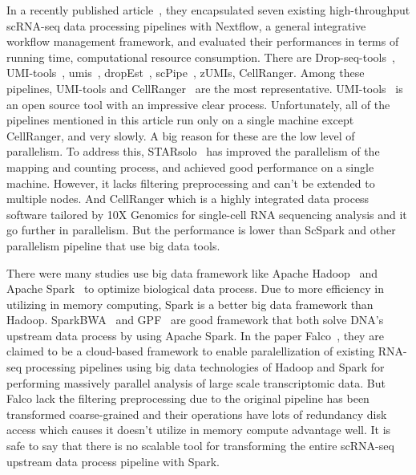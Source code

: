 \documentclass[runningheads]{llncs}
\begin{document}
In a recently published article~\cite{gao2020Comparison}, they encapsulated seven existing
                                                                                          high-throughput
                                                                                                          scRNA-seq data processing pipelines with Nextflow, a general integrative workflow management framework, and evaluated their performances in terms of running time, computational resource consumption.
There are Drop-seq-tools~\cite{macosko2015Dropseq}, UMI-tools~\cite{smith2017UMI}, umis~\cite{macaulay0Svensson}, dropEst~\cite{viktor2018dropEst}, scPipe~\cite{tian2018scPipe}, zUMIs\cite{swati0zUMIs}, CellRanger\cite{zheng2017Massively}.
Among these pipelines, UMI-tools\cite{smith2017UMI} and CellRanger~\cite{zheng2017Massively} are the most representative.
UMI-tools~\cite{ref_url1} is an open source tool with an impressive clear process.
Unfortunately, all of the pipelines mentioned in this article run only on a single machine except CellRanger, and very slowly.
A big reason for these are the low level of parallelism.
To address this, STARsolo~\cite{2019STARsolo} has improved the parallelism of the mapping and counting process, and achieved good performance on a single machine.
However, it lacks filtering preprocessing and can't be extended to multiple nodes.
And CellRanger which is a highly integrated data process software tailored by 10X Genomics for single-cell RNA sequencing analysis and it go further in parallelism.
But the performance is lower than ScSpark and other parallelism pipeline that use big data tools.

There were many studies use big data framework like Apache Hadoop~\cite{ref_url2} and Apache Spark~\cite{ref_url3} to optimize biological data process.
Due to more efficiency in utilizing in memory computing, Spark is a better big data framework than Hadoop.
SparkBWA~\cite{abuin2016sparkbwa} and GPF~\cite{li2018high} are good framework that both solve DNA's upstream data process by using Apache Spark.
In the paper Falco~\cite{Yang2016Falco}, they are claimed to be a cloud-based framework to enable paralellization of existing RNA-seq processing pipelines using big data technologies of Hadoop and Spark for performing massively parallel analysis of large scale transcriptomic data. 
But Falco lack the filtering preprocessing due to the original pipeline has been transformed coarse-grained and their operations have lots of redundancy disk access which causes it doesn't utilize in memory compute advantage well.
It is safe to say that there is no scalable tool for transforming the entire scRNA-seq upstream data process pipeline with Spark.
\end{document}
